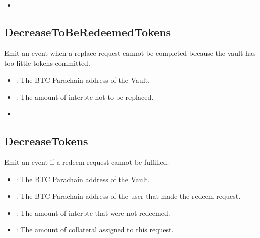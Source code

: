 \documentclass[a4paper,10pt,english]{sphinxmanual}
\begin{document}
\begin{itemize}
\item {} 
{\hyperref[\detokenize{spec/vault-registry:tryincreasetoberedeemedtokens}]{}}

\end{itemize}


\subsection{DecreaseToBeRedeemedTokens}
\label{\detokenize{spec/vault-registry:id46}}
Emit an event when a replace request cannot be completed because the vault has too little tokens committed.



\begin{itemize}
\item {} 
: The BTC Parachain address of the Vault.

\item {} 
: The amount of interbtc not to be replaced.

\end{itemize}

\begin{itemize}
\item {} 
{\hyperref[\detokenize{spec/vault-registry:decreasetoberedeemedtokens}]{}}

\end{itemize}


\subsection{DecreaseTokens}
\label{\detokenize{spec/vault-registry:id47}}
Emit an event if a redeem request cannot be fulfilled.



\begin{itemize}
\item {} 
: The BTC Parachain address of the Vault.

\item {} 
: The BTC Parachain address of the user that made the redeem request.

\item {} 
: The amount of interbtc that were not redeemed.

\item {} 
: The amount of collateral assigned to this request.

\end{itemize}
\end{document}
